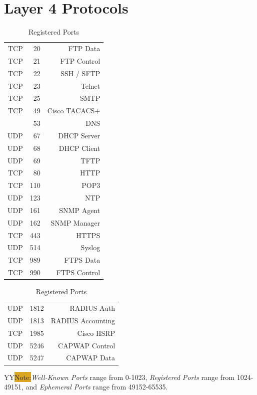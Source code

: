 \documentclass[12pt]{article}
\newcommand{\printColor}{Y}								%
\newcommand{\note}[1]{\if\printColor Y{\colorbox{#1}{Note:}}\else{\underline{Note:}}\fi}
\begin{document}
\section{Layer 4 Protocols \label{sec:L4}}
	\begin{table}[H]
	\begin{minipage}[t]{.45\linewidth}
	\centering
	\caption{Well-Known Ports \label{tab:L4 PORTS KNOWN}}
	\begin{tabular}{| rr | r |}\hline
	TCP	& 20		& FTP Data\\
	TCP	& 21		& FTP Control\\\hline
	TCP	& 22		& SSH / SFTP\\\hline
	TCP	& 23		& Telnet\\\hline
	TCP	& 25		& SMTP\\\hline
	TCP	& 49		& Cisco TACACS+\\\hline
	       	& 53		& DNS\\\hline
	UDP	& 67		& DHCP Server\\
	UDP	& 68		& DHCP Client\\\hline
	UDP	& 69		& TFTP\\\hline
	TCP	& 80		& HTTP\\\hline
	TCP	& 110		& POP3\\\hline
	UDP	& 123		& NTP\\\hline
	UDP	& 161		& SNMP Agent\\
	UDP	& 162		& SNMP Manager\\\hline
	TCP	& 443		& HTTPS\\\hline
	UDP	& 514		& Syslog\\\hline
	TCP	& 989		& FTPS Data\\
	TCP	& 990		& FTPS Control\\\hline
	\end{tabular}\end{minipage}\hfill
	\begin{minipage}[t]{.45\linewidth}
	\centering
	\caption{Registered Ports \label{tab:L4 PORTS REGISTERED}}
	\begin{tabular}{| cr | r |}\hline
	UDP	& 1812	& RADIUS Auth\\
	UDP	& 1813	& RADIUS Accounting\\\hline
	TCP	& 1985	& Cisco HSRP\\\hline
	UDP	& 5246	& CAPWAP Control\\
	UDP	& 5247	& CAPWAP Data\\\hline
	\end{tabular}\end{minipage}\end{table}
	\note{Goldenrod}\textit{Well-Known Ports} range from 0-1023, \textit{Registered Ports} range from 1024-49151, and \textit{Ephemeral Ports} range from 49152-65535.
\end{document}
